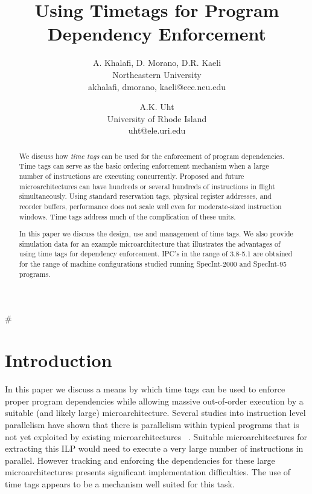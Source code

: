 \documentclass[10pt,twocolumn]{article}
\begin{document}
%
#\parskip 1mm
\parskip 2mm
%
%
\title{Using Timetags for Program Dependency Enforcement}
%
\author{
A. Khalafi, D. Morano, D.R. Kaeli\\
Northeastern University\\
{akhalafi, dmorano, kaeli}@ece.neu.edu\\
\and
A.K. Uht\\
University of Rhode Island\\ 
uht@ele.uri.edu
}
%
%
%
%
\maketitle
%
%
%
\begin{abstract}
We discuss how {\em time tags} can be used for the enforcement of
program dependencies.
Time tags can serve as the basic ordering enforcement mechanism
when a large number of instructions are executing concurrently.
Proposed and future microarchitectures can have hundreds or several hundreds
of instructions in flight simultaneously. Using standard 
reservation
tags, physical register addresses, and reorder buffers,
performance does not scale
well even for moderate-sized instruction windows.
Time tags address much of the complication of these units.

In this paper we discuss the
design, use and management of time tags.
We also provide simulation data for an example microarchitecture
that illustrates the
advantages of using time tags for dependency enforcement.  IPC's
in the range of 3.8-5.1 are obtained for the
range of machine configurations studied running SpecInt-2000 and
SpecInt-95 programs. 
\end{abstract}
%
%
\section{Introduction}
%
In this paper we discuss a means by which time tags can be used
to enforce proper program dependencies while allowing
massive out-of-order execution by a suitable (and likely large)
microarchitecture.
Several studies into instruction level parallelism
have shown that there is parallelism within
typical programs that is not yet exploited by existing
microarchitectures ~\cite{Gon97,Lam92,Uht95}.  
Suitable microarchitectures for extracting this ILP would need to
execute a very large number of instructions in parallel.
However tracking and enforcing the dependencies for these
large microarchitectures presents significant implementation
difficulties.  The use of time tags appears to be a mechanism well suited
for this task.
\end{document}
